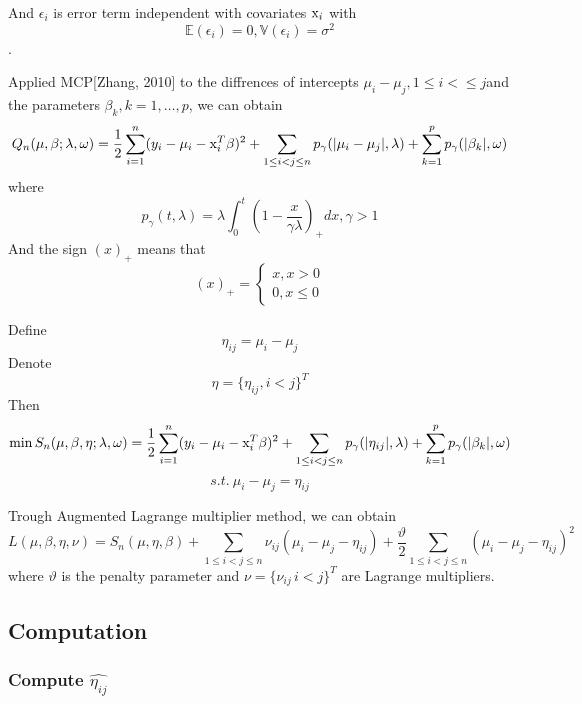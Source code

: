 \documentclass[cjk,10pt]{beamer}
\begin{document}
\begin{CJK*}{GBK}{song}
\begin{frame}
And $\epsilon_i$ is error term independent with covariates ${\rm x}_i$ with
$$\mathbb{E}(\epsilon_i)=0, \mathbb{V}(\epsilon_i)=\sigma^2$$.
\end{frame}
\begin{frame}
Applied MCP[Zhang, 2010] to the diffrences of intercepts $\mu_i-\mu_j, 1\le i<\le j$and the parameters $\beta_k, k=1,\dots,p$, we can obtain
$$Q_n(\mu,\beta;\lambda,\omega)=\frac{1}{2}\sum_{i=1}^n(y_i-\mu_i-{\rm x}_i^T\beta)^2+\sum_{1\le i< j\le n}p_{\gamma}(|\mu_i-\mu_j|,\lambda)+\sum_{k=1}^pp_{\gamma}(|\beta_k|,\omega)$$
where
$$p_{\gamma}(t,\lambda)=\lambda\int_0^t(1-\frac{x}{\gamma\lambda})_+dx,\gamma>1$$
And the sign $(x)_+$ means that
$$(x)_+=\begin{cases}x,x>0\\0,x\le 0\end{cases}$$

\end{frame}

\begin{frame}
Define
$$\eta_{ij}=\mu_i-\mu_j$$
Denote
$$\eta = \{\eta_{ij},i<j\}^T$$
Then
$$\min S_n(\mu, \beta,\eta;\lambda,\omega)=\frac{1}{2}\sum_{i=1}^n(y_i-\mu_i-{\rm x}_i^T\beta)^2+\sum_{1\le i< j\le n}p_{\gamma}(|\eta_{ij}|,\lambda)+\sum_{k=1}^pp_{\gamma}(|\beta_k|,\omega)$$
$$s.t.\ \mu_i-\mu_j=\eta_{ij}$$
\end{frame}
\begin{frame}
Trough Augmented Lagrange multiplier method, we can obtain
$$L(\mu,\beta,\eta,\nu)=S_n(\mu,\eta,\beta)+\sum_{1\le i<j\le n}\nu_{ij}(\mu_i-\mu_j-\eta_{ij})+\frac{\vartheta}{2}\sum_{1\le i<j\le n}(\mu_i-\mu_j-\eta_{ij})^2$$
where $\vartheta$ is the penalty parameter and $\nu=\{\nu_{ij}\,i<j\}^T$ are Lagrange multipliers.
\end{frame}
\subsection{Computation}
\begin{frame}
\frametitle{Compute $\hat{\eta_{ij}}$}


\end{frame}
\end{CJK*}
\end{document}
